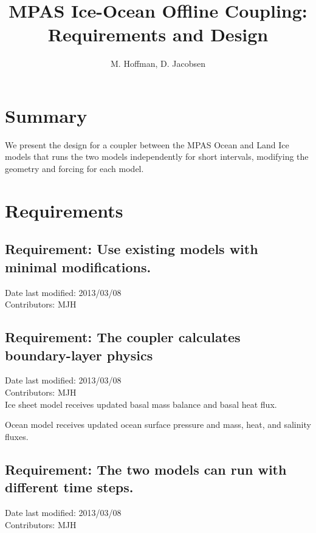\documentclass[11pt]{report}
\begin{document}
\title{ MPAS Ice-Ocean Offline Coupling: \\
Requirements and Design}
\author{M. Hoffman, D. Jacobsen}

\maketitle
\tableofcontents


\chapter{Summary}

We present the design for a coupler between the MPAS Ocean and Land Ice models that runs the two models independently for short intervals, modifying the geometry and forcing for each model.



\chapter{Requirements}

\section{Requirement: Use existing models with minimal modifications.}
Date last modified: 2013/03/08 \\
Contributors: MJH \\

\section{Requirement: The coupler calculates boundary-layer physics}
Date last modified: 2013/03/08 \\
Contributors: MJH \\

Ice sheet model receives updated basal mass balance and basal heat flux.

Ocean model receives updated ocean surface pressure and mass, heat, and salinity fluxes.

\section{Requirement: The two models can run with different time steps.}
Date last modified: 2013/03/08 \\
Contributors: MJH \\
\end{document}
